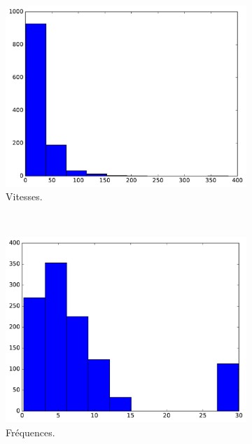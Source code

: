 	\begin{figure}[!htbp]
		\begin{subfigure}[t]{\subImgWclicks}
			\centering
			\includegraphics[width=\textwidth]{figures/ch3/spaceA_filteredSpeed}
			\caption{Vitesses.}
			\label{fig:spaceA_filteredSpeed}
		\end{subfigure}
		~
		\begin{subfigure}[t]{\subImgWclicks}
			\centering
			\includegraphics[width=\textwidth]{figures/ch3/spaceA_frequency}
			\caption{Fréquences.}
			\label{fig:spaceA_frequency}
		\end{subfigure}
		~
		\begin{subfigure}[t]{\subImgWclicks}
			\centering

\end{subfigure}
\end{figure}
